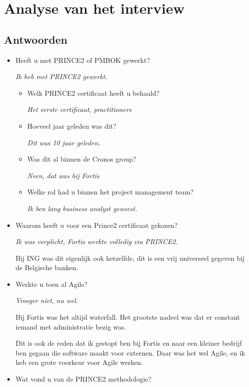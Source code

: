 \documentclass[]{article}
\begin{document}
\section{Analyse van het interview}

\subsection{Antwoorden}
\begin{itemize}
	\item Heeft u met PRINCE2 of PMBOK gewerkt?
	
		{\it Ik heb met PRINCE2 gewerkt.}
	\begin{itemize}
		\item Welk PRINCE2 certificaat heeft u behaald?
		
		{\it Het eerste certificaat, practitioners}
		
		\item Hoeveel jaar geleden was dit?
		
		{\it 
			Dit was 10 jaar geleden.
		}
	
		\item Was dit al binnen de Cronos group?
		
		{\it 
			Neen, dat was bij Fortis
		}
	
		\item Welke rol had u binnen het project management team?
		
		{\it 
			Ik ben lang business analyst geweest.
		}
	\end{itemize}
	\item Waarom heeft u voor een Prince2 certificaat gekozen?
	
	{\it 
		Ik was verplicht, Fortis werkte volledig via PRINCE2.
		
		Bij ING was dit eigenlijk ook hetzelfde, dit is een vrij universeel gegeven bij de Belgische banken.
	}
	\item Werkte u toen al Agile?
	
	{\it 
		Vroeger niet, nu wel.
		
		Bij Fortis was het altijd waterfall. Het grootste nadeel was dat er constant iemand met administratie bezig was.
		
		Dit is ook de reden dat ik gestopt ben bij Fortis en naar een kleiner bedrijf ben gegaan die software maakt voor externen. Daar was het wel Agile, en ik heb een grote voorkeur voor Agile werken.
	}
	\item Wat vond u van de PRINCE2 methodologie?
	

\end{itemize}
\end{document}
